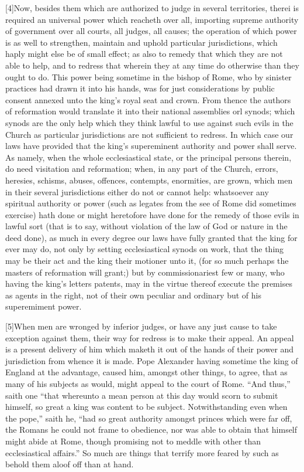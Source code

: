 [4]Now, besides them which are authorized to judge in several territories, therei is required an universal power which reacheth over all, importing supreme authority of government over all courts, all judges, all causes; the operation of which power is as well to strengthen, maintain and uphold particular jurisdictions, which haply might else be of small effect; as also to remedy that which they are not able to help, and to redress that wherein they at any time do otherwise than they ought to do. This power being sometime in the bishop of Rome, who by sinister practices had drawn it into  his hands, was for just considerations by public consent annexed unto the king’s royal seat and crown. From thence the authors of reformation would translate it into their national assemblies orl synods; which synods are the only help which they think lawful to use against such evils in the Church as particular jurisdictions are not sufficient to redress. In which case our laws have provided that the king’s supereminent authority and power shall serve. As namely, when the whole ecclesiastical state, or the principal persons therein, do need visitation and reformation; when, in any part of the Church, errors, heresies, schisms, abuses, offences, contempts, enormities, are grown, which men in their several jurisdictions either do not or cannot help: whatsoever any spiritual authority or power (such as legates from the see of Rome did sometimes exercise) hath done or might heretofore have done for the remedy of those evils in lawful sort (that is to say, without violation of the law of God or nature in the deed done), as much in every degree our laws have fully granted that the king for ever may do, not only by setting ecclesiastical synods on work, that the thing may be their act and the king their motioner unto it, (for so much perhaps the masters of reformation will grant;) but by commissionariest few or many, who having the king’s letters patents, may in the virtue thereof execute the premises as agents in the right, not of their own peculiar and ordinary but of his superemiment power.

[5]When men are wronged by inferior judges, or have any just cause to take exception against them, their way for redress is to make their appeal. An appeal is a present delivery of him which maketh it out of the hands of their power and jurisdiction from whence it is made. Pope Alexander having sometime the king of England at the advantage, caused him, amongst other things, to agree, that as many of his subjects as would, might appeal to the court of Rome.  “And thus,” saith one “that whereunto a mean person at this day would scorn to submit himself, so great a king was content to be subject. Notwithstanding even when the pope,” saith he, “had so great authority amongst princes which were far off, the Romans he could not frame to obedience, nor was able to obtain that himself might abide at Rome, though promising not to meddle with other than ecclesiastical affairs.” So much are things that terrify more feared by such as behold them aloof off than at hand.

